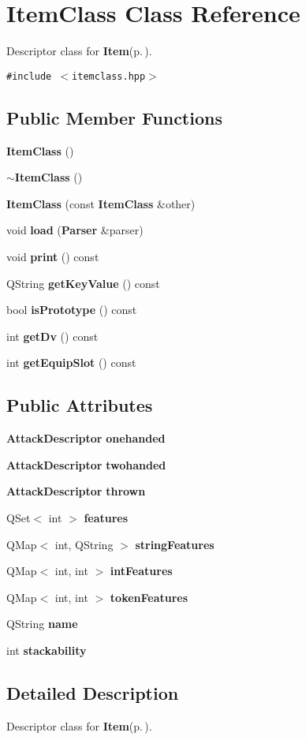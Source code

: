 \section{Item\-Class Class Reference}
\label{classItemClass}
Descriptor class for {\bf Item}{\rm (p.\,\pageref{classItem})}.  


{\tt \#include $<$itemclass.hpp$>$}

\subsection*{Public Member Functions}
\begin{CompactItemize}
\item 
{\bf Item\-Class} ()
\item 
{\bf $\sim$Item\-Class} ()
\item 
{\bf Item\-Class} (const {\bf Item\-Class} \&other)
\item 
void {\bf load} ({\bf Parser} \&parser)
\item 
void {\bf print} () const 
\item 
QString {\bf get\-Key\-Value} () const 
\item 
bool {\bf is\-Prototype} () const 
\item 
int {\bf get\-Dv} () const 
\item 
int {\bf get\-Equip\-Slot} () const 
\end{CompactItemize}
\subsection*{Public Attributes}
\begin{CompactItemize}
\item 
{\bf Attack\-Descriptor} {\bf onehanded}
\item 
{\bf Attack\-Descriptor} {\bf twohanded}
\item 
{\bf Attack\-Descriptor} {\bf thrown}
\item 
QSet$<$ int $>$ {\bf features}
\item 
QMap$<$ int, QString $>$ {\bf string\-Features}
\item 
QMap$<$ int, int $>$ {\bf int\-Features}
\item 
QMap$<$ int, int $>$ {\bf token\-Features}
\item 
QString {\bf name}
\item 
int {\bf stackability}
\end{CompactItemize}


\subsection{Detailed Description}
Descriptor class for {\bf Item}{\rm (p.\,\pageref{classItem})}. 



